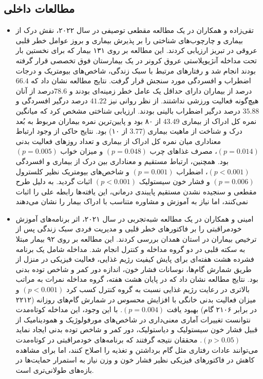 \subsection{مطالعات داخلی}


\begin{itemize}
\item تقی‌زاده و همکاران در یک مطالعه مقطعی توصیفی در سال ۲۰۲۲، نقش درک از بیماری و چارچوب‌های شناختی را بر پذیرش بیماری و بروز عوامل خطر قلبی عروقی در تبریز ارزیابی کردند. این مطالعه بر روی ۱۳۱ بیمار که برای نخستین بار تحت مداخله آنژیوپلاستی عروق کرونر در یک بیمارستان فوق تخصصی قرار گرفته بودند انجام شد و رفتارهای مرتبط با سبک زندگی، شاخص‌های بیومتریک و درجات اضطراب و افسردگی مورد سنجش قرار گرفت. نتایج مطالعه نشان داد که $66.4$درصد از بیماران دارای حداقل یک عامل خطر زمینه‌ای بودند و $78.6$درصد از آنان هیچ‌گونه فعالیت ورزشی نداشتند. از نظر روانی نیز $41.22$ درصد درگیر افسردگی و $35.88$ درصد درگیر اضطراب بالینی بودند. ارزیابی شناختی مشخص کرد که میانگین نمره کل ادراک از بیماری $43.49$ از ۸۰ بود و پایین‌ترین نمره بیماران مربوط به بُعد درک و شناخت از ماهیت بیماری ($3.77$ از ۱۰) بود. نتایج حاکی از وجود ارتباط معناداری میان نمره کل ادراک از بیماری و تعداد روزهای فعالیت بدنی $(p=0.014)$، مصرف غذاهای چرب $(p=0.048)$ و میزان خواب $(p=0.005)$ بود. همچنین، ارتباط مستقیم و معناداری بین درک از بیماری و افسردگی $(p<0.001)$، اضطراب $(p=0.001)$ و شاخص‌های بیومتریک نظیر کلسترول $(p=0.006)$ و فشار خون سیستولیک $(p<0.001)$ اثبات گردید. به دلیل طرح مقطعی و سنجیده نشدن مستقیم پایبندی درمانی، این یافته‌ها رابطه علی را اثبات نمی‌کنند، اما نیاز به آموزش و مشاوره متناسب با ادراک بیمار را نشان می‌دهند \cite{Thagizadeh2022IllnessPerception}

\item امینی و همکاران در یک مطالعه شبه‌تجربی در سال ۲۰۲۱، اثر برنامه‌های آموزش خودمراقبتی را بر فاکتورهای خطر قلبی و مدیریت فردی سبک زندگی پس از ترخیص بیماران در استان همدان بررسی کردند. این مطالعه بر روی ۹۲ بیمار مبتلا به سکته قلبی در دو گروه مداخله و کنترل انجام شد. مداخله شامل یک برنامه فشرده هشت هفته‌ای برای پایش کیفیت رژیم غذایی، فعالیت فیزیکی در منزل از طریق شمارش گام‌ها، نوسانات فشار خون، اندازه دور کمر و شاخص توده بدنی بود. نتایج مطالعه نشان داد که در پایان هشت هفته، گروه مداخله نمرات به مراتب بالاتری در رعایت رژیم غذایی نسبت به گروه کنترل کسب کرد $(p<0.001)$ و میزان فعالیت بدنی خانگی با افزایش محسوس در شمارش گام‌های روزانه (۲۲۱۲ در برابر ۲۱۰۶ گام) بهبود یافت $(p=0.004)$. با این وجود، این مداخله کوتاه‌مدت نتوانست تغییرات آماری معنی‌داری در شاخص‌های مورفولوژیک و همودینامیک از قبیل فشار خون سیستولیک و دیاستولیک، دور کمر و شاخص توده بدنی ایجاد نماید $(p>0.05)$. محققان نتیجه گرفتند که برنامه‌های خودمراقبتی در کوتاه‌مدت می‌توانند عادات رفتاری مثل گام برداشتن و تغذیه را اصلاح کنند، اما برای مشاهده کاهش در فاکتورهای فیزیکی نظیر فشار خون و وزن نیاز به استمرار حمایت‌ها در بازه‌های طولانی‌تری است. \cite{Amini2021SelfManagement}


\end{itemize}
